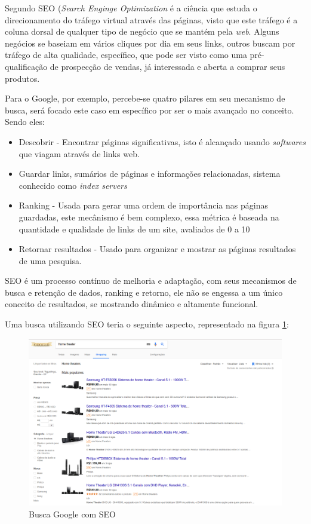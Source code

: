 Segundo \cite{harold:2006} %
SEO (\textit{Search Enginge Optimization} é a ciência que estuda o direcionamento do tráfego virtual através das páginas, visto que este tráfego é a coluna dorsal de qualquer tipo de negócio que se mantém pela \textit{web}. Alguns negócios se baseiam em vários cliques por dia em seus links, outros buscam por tráfego de alta qualidade, específico, que pode ser visto como uma pré-qualificação de prospecção de vendas, já interessada e aberta a comprar seus produtos.

Para o Google, por exemplo, percebe-se quatro pilares em seu mecanismo de busca, será focado este caso em específico por ser o mais avançado no conceito. Sendo eles:
\begin{itemize}
\item Descobrir - Encontrar páginas significativas, isto é alcançado usando \textit{softwares} que viagam através de links web.
\item Guardar links, sumários de páginas e informações relacionadas, sistema conhecido como \textit{index servers}
\item Ranking - Usada para gerar uma ordem de importância nas páginas guardadas, este mecânismo é bem complexo, essa métrica é baseada na quantidade e qualidade de links de um site, avaliados de 0 a 10
\item Retornar resultados - Usado para organizar e mostrar as páginas resultados de uma pesquisa.
\end{itemize}

SEO é um processo contínuo de melhoria e adaptação, com seus mecanismos de busca e retenção de dados, ranking e retorno, ele não se engessa a um único conceito de resultados, se mostrando dinâmico e altamente funcional.

Uma busca utilizando SEO teria o seguinte aspecto, representado na figura \ref{fig02}:

\begin{figure}[h]
	\centering
	\includegraphics[keepaspectratio=true,scale=0.3]{figuras/GoogleBusca.png}
	\caption{Busca Google com SEO}
	\label{fig02}
\end{figure}

